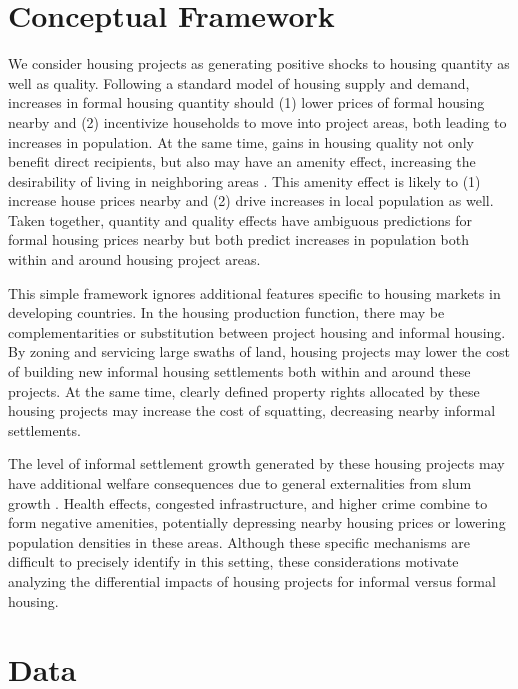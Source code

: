 \documentclass[12pt]{article}
\begin{document}
\section{Conceptual Framework}\label{section:model}

We consider housing projects as generating positive shocks to housing quantity as well as quality.  Following a standard model of housing supply and demand, increases in formal housing quantity should (1) lower prices of formal housing nearby and (2) incentivize households to move into project areas, both leading to increases in population.  At the same time, gains in housing quality not only benefit direct recipients, but also may have an amenity effect, increasing the desirability of living in neighboring areas \citep{diamond2016wants}.  This amenity effect is likely to (1) increase house prices nearby and (2) drive increases in local population as well.  Taken together, quantity and quality effects have ambiguous predictions for formal housing prices nearby but both predict increases in population both within and around housing project areas.

This simple framework ignores additional features specific to housing markets in developing countries.  In the housing production function, there may be complementarities or substitution between project housing and informal housing.  By zoning and servicing large swaths of land, housing projects may lower the cost of building new informal housing settlements both within and around these projects.  At the same time, clearly defined property rights allocated by these housing projects may increase the cost of squatting, decreasing nearby informal settlements.

The level of informal settlement growth generated by these housing projects may have additional welfare consequences due to general externalities from slum growth \citep{10.1257/jep.27.4.187}.  Health effects, congested infrastructure, and higher crime combine to form negative amenities, potentially depressing nearby housing prices or lowering population densities in these areas.  Although these specific mechanisms are difficult to precisely identify in this setting, these considerations motivate analyzing the differential impacts of housing projects for informal versus formal housing.


\section{Data}\label{section:data}
\end{document}
